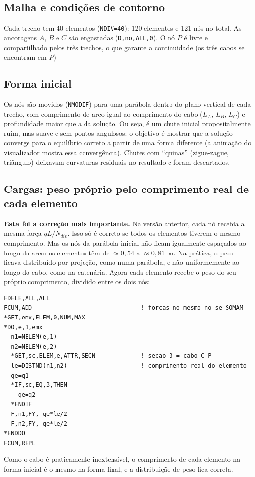 \documentclass[11pt,a4paper]{article}
\begin{document}
\subsection{Malha e condições de contorno}
Cada trecho tem 40 elementos (\texttt{NDIV=40}): 120 elementos e 121 nós no total. As ancoragens
$A$, $B$ e $C$ são engastadas (\texttt{D,no,ALL,0}). O nó $P$ é livre e compartilhado pelos três
trechos, o que garante a continuidade (os três cabos se encontram em $P$).

\subsection{Forma inicial}\label{sec:forma}
Os nós são movidos (\texttt{NMODIF}) para uma parábola dentro do plano vertical de cada trecho, com
comprimento de arco igual ao comprimento do cabo ($L_A$, $L_B$, $L_C$) e profundidade maior que a da
solução. Ou seja, é um chute inicial propositalmente ruim, mas suave e sem pontos angulosos: o
objetivo é mostrar que a solução converge para o equilíbrio correto a partir de uma forma diferente
(a animação do visualizador mostra essa convergência). Chutes com ``quinas'' (zigue-zague,
triângulo) deixavam curvaturas residuais no resultado e foram descartados.

\subsection{Cargas: peso próprio pelo comprimento real de cada elemento}\label{sec:carga}
\textbf{Esta foi a correção mais importante.} Na versão anterior, cada nó recebia a mesma força
$q L/N_{div}$. Isso só é correto se todos os elementos tiverem o mesmo comprimento. Mas os nós da
parábola inicial não ficam igualmente espaçados ao longo do arco: os elementos têm de
$\approx 0{,}54$ a $\approx 0{,}81$~m. Na prática, o peso ficava distribuído por projeção, como numa
parábola, e não uniformemente ao longo do cabo, como na catenária.
Agora cada elemento recebe o peso do seu próprio comprimento, dividido entre os dois nós:
\begin{lstlisting}[language=APDL]
FDELE,ALL,ALL
FCUM,ADD                               ! forcas no mesmo no se SOMAM
*GET,emx,ELEM,0,NUM,MAX
*DO,e,1,emx
  n1=NELEM(e,1)
  n2=NELEM(e,2)
  *GET,sc,ELEM,e,ATTR,SECN             ! secao 3 = cabo C-P
  le=DISTND(n1,n2)                     ! comprimento real do elemento
  qe=q1
  *IF,sc,EQ,3,THEN
    qe=q2
  *ENDIF
  F,n1,FY,-qe*le/2
  F,n2,FY,-qe*le/2
*ENDDO
FCUM,REPL
\end{lstlisting}
Como o cabo é praticamente inextensível, o comprimento de cada elemento na forma inicial é o mesmo
na forma final, e a distribuição de peso fica correta.
\end{document}
